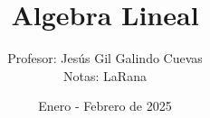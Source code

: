 \documentclass{IEEEtran}
\title{Algebra Lineal}
\author{Profesor: Jes\'{u}s Gil Galindo Cuevas\\Notas: LaRana}
\date{Enero - Febrero de 2025}
\begin{document}
\maketitle



\newpage

%


\newpage
\twocolumn





%

%
\end{document}
